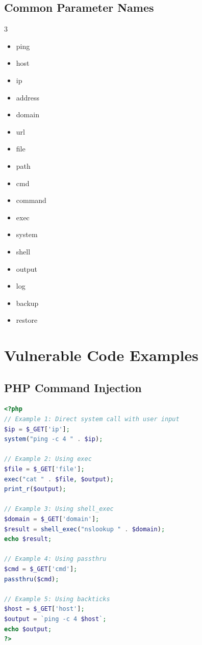 \documentclass[12pt]{article}
\begin{document}
\subsection{Common Parameter Names}

\begin{multicols}{3}
\begin{itemize}
    \item ping
    \item host
    \item ip
    \item address
    \item domain
    \item url
    \item file
    \item path
    \item cmd
    \item command
    \item exec
    \item system
    \item shell
    \item output
    \item log
    \item backup
    \item restore
\end{itemize}
\end{multicols}

\section{Vulnerable Code Examples}

\subsection{PHP Command Injection}

\begin{lstlisting}[language=PHP, caption=Vulnerable PHP Code]
<?php
// Example 1: Direct system call with user input
$ip = $_GET['ip'];
system("ping -c 4 " . $ip);

// Example 2: Using exec
$file = $_GET['file'];
exec("cat " . $file, $output);
print_r($output);

// Example 3: Using shell_exec
$domain = $_GET['domain'];
$result = shell_exec("nslookup " . $domain);
echo $result;

// Example 4: Using passthru
$cmd = $_GET['cmd'];
passthru($cmd);

// Example 5: Using backticks
$host = $_GET['host'];
$output = `ping -c 4 $host`;
echo $output;
?>
\end{lstlisting}
\end{document}
